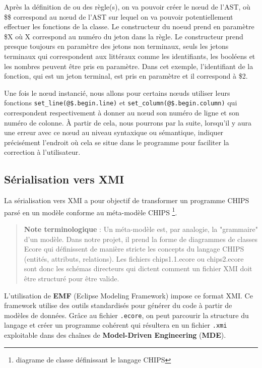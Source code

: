 \documentclass[a4paper, 11pt]{article}
\DeclareRobustCommand{\prog}[1]{\begingroup\urlstyle{tt}\nolinkurl{#1}\endgroup}
\newcommand{\kw}[1]{\textbf{#1}}
\begin{document}
Après la définition de ou des règle(s), on va pouvoir créer le nœud de l'AST, où \$\$ correspond au nœud de l'AST sur lequel on va pouvoir potentiellement effectuer les fonctions de la classe. Le constructeur du noeud prend en paramètre \$X où X correspond au numéro du jeton dans la règle. Le constructeur prend presque toujours en paramètre des jetons non terminaux, seuls les jetons terminaux qui correspondent aux littéraux comme les identifiants, les booléens et les nombres peuvent être pris en paramètre. Dans cet exemple, l'identifiant de la fonction, qui est un jeton terminal, est pris en paramètre et il correspond à \$2.

Une fois le nœud instancié, nous allons pour certains nœuds utiliser leurs fonctions \prog{set\_line(@$.begin.line)} et \prog{set\_column(@$.begin.column)} qui correspondent respectivement à donner au nœud son numéro de ligne et son numéro de colonne. À partir de cela, nous pourrons par la suite, lorsqu'il y aura une erreur avec ce nœud au niveau syntaxique ou sémantique, indiquer précisément l'endroit où cela se situe dans le programme pour faciliter la correction à l'utilisateur.

\subsection{Sérialisation vers XMI}

La sérialisation vers XMI a pour objectif de transformer un programme CHIPS parsé en un modèle conforme au méta-modèle CHIPS \footnote{diagrame de classe définissant le langage CHIPS}.

\begin{quote}\textbf{Note terminologique} : Un méta-modèle est, par analogie, la "grammaire" d'un modèle. Dans notre projet, il prend la forme de diagrammes de classes Ecore qui définissent de manière stricte les concepts du langage CHIPS (entités, attributs, relations). Les fichiers chips1.1.ecore ou chips2.ecore sont donc les schémas directeurs qui dictent comment un fichier XMI doit être structuré pour être valide.
\end{quote}

L'utilisation de \kw{EMF} (Eclipse Modeling Framework) impose ce format XMI. Ce framework utilise des outils standardisés pour générer du code à partir de modèles de données. Grâce au fichier \prog{.ecore}, on peut parcourir la structure du langage et créer un programme cohérent qui résultera en un fichier \prog{.xmi} exploitable dans des chaînes de \kw{Model-Driven Engineering} (\kw{MDE}).
\end{document}

